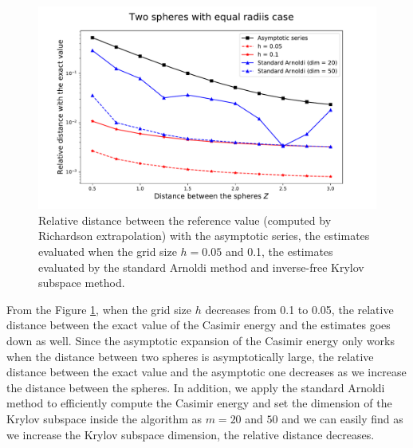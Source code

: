 \begin{figure}[H]
    \includegraphics[scale = 0.7]{figures/rel_dist_equal_radii.pdf}
    \caption{Relative distance between the reference value (computed by Richardson extrapolation) with the asymptotic series, the estimates evaluated when the 
    grid size $h = 0.05$ and 0.1, the estimates evaluated by the standard Arnoldi method and inverse-free Krylov subspace method.
     {\color{red}{should add inverse-free Krylov method later on the figure}}}
    \label{equal_radii_rel_dist}
\end{figure}

From the Figure \ref{equal_radii_rel_dist}, when the grid size $h$ decreases from 0.1 to 0.05, the relative distance between the exact value of the Casimir energy and the estimates 
goes down as well. Since the asymptotic expansion of the Casimir energy only works when the distance between two spheres is asymptotically large, the relative 
distance between the exact value and the asymptotic one decreases as we increase the distance between the spheres. In addition, we apply the standard Arnoldi
method to efficiently compute the Casimir energy and set the dimension of the Krylov subspace inside the algorithm as $m = 20$ and $50$ and we can easily find 
as we increase the Krylov subspace dimension, the relative distance decreases.

